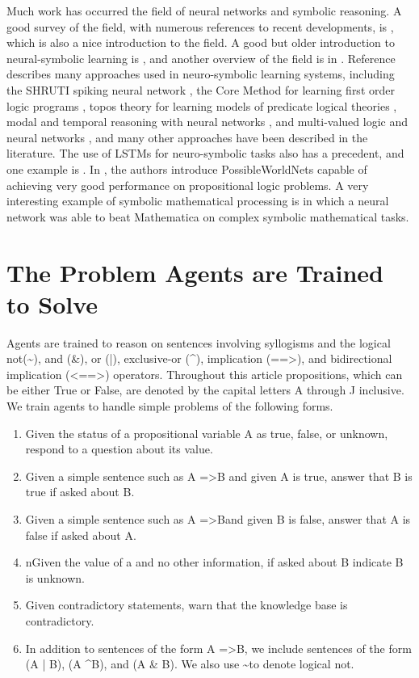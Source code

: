 \documentclass{article}
\begin{document}
Much work has occurred the field of neural networks and symbolic reasoning.
A good survey of the field, with numerous references to recent developments, is
\cite{DBLP:journals/corr/abs-1711-03902}, which is also a nice introduction to
the field.
A good but older introduction to neural-symbolic learning is \cite{neural_symbolic_2002},
and another overview of the field is in
\cite{bica2015_integrated_neural_symbolic}.
Reference
\cite{neural_symbolic_2007} describes many approaches used in neuro-symbolic
learning systems, including the SHRUTI spiking neural network
\cite{shruti_2007}, the Core Method for learning first order logic programs
\cite{core_method_2007}, topos theory for learning models of
predicate logical theories \cite{topos_theory_2007}, modal and temporal
reasoning with neural networks \cite{modal_temporal_2007}, and multi-valued
logic and neural networks \cite{multi_valued_logic_2007}, and many other
approaches have been described in the literature.  The use of LSTMs for
neuro-symbolic tasks also has a precedent,
and one example is \cite{captcha_2017}.
In \cite{possible_worlds}, the authors introduce PossibleWorldNets
capable of achieving very good performance on propositional logic problems.
A very interesting example of symbolic mathematical processing 
is \cite{microsoft_research_symbolic_math} in which a neural network
was able to beat Mathematica on complex symbolic mathematical tasks.

\section{The Problem Agents are Trained to Solve}

Agents are trained to reason on sentences involving syllogisms and the logical not(\textasciitilde), and (\&), or (|), exclusive-or (\textasciicircum), implication (==\textgreater), and bidirectional implication (\textless==\textgreater) operators. Throughout this article propositions, which can be either True or False, are denoted by the capital letters A through J inclusive. We train agents to handle simple problems of the following forms.

\begin{enumerate}
	\item Given the status of a propositional variable A as true, false, or unknown, respond to a question about its value.
	\item Given a simple sentence such as A =\textgreater B and given A is true, answer that B is true if asked about B.
	\item Given a simple sentence such as A =\textgreater Band given B is false, answer that A is false if asked about A.
	\item nGiven the value of a and no other information, if asked about B indicate B is unknown.
	\item Given contradictory statements, warn that the knowledge base is contradictory.
	\item In addition to sentences of the form A =\textgreater B, we include sentences of the form (A | B), (A \textasciicircum B), and (A \& B). We also use \textasciitilde to denote logical not.
\end{enumerate}
\end{document}
